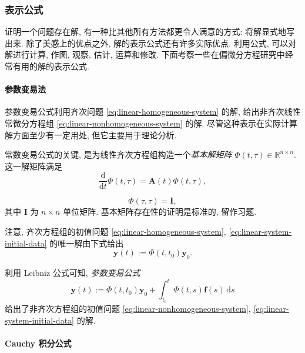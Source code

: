 \subsubsection{表示公式}\label{subsec:representations}

证明一个问题存在解, 有一种比其他所有方法都更令人满意的方式: 将解显式地写出来. 除了美感上的优点之外, 解的表示公式还有许多实际优点. 利用公式, 可以对解进行计算, 作图, 观察, 估计, 运算和修改. 下面考察一些在偏微分方程研究中经常有用的解的表示公式.

\paragraph*{参数变易法}

参数变易公式利用齐次问题 \eqref{eq:linear-homogeneous-system} 的解, 给出非齐次线性常微分方程组 \eqref{eq:linear-nonhomogeneous-system} 的解. 尽管这种表示在实际计算解方面至少有一定用处, 但它主要用于理论分析.

常数变易公式的关键, 是为线性齐次方程组构造一个\emph{基本解矩阵} $\Phi(t,\tau)\in\mathbb{R}^{n\times n}$. 这一解矩阵满足
\begin{equation}\label{eq:fundamental-matrix-dynamics}
\dfrac{\mathrm{d}}{\mathrm{d}t}\Phi(t,\tau)=\bm{A}(t)\Phi(t,\tau),
\end{equation}

\begin{equation}\label{eq:fundamental-matrix-normalization}
\Phi(\tau,\tau)=\bm{I},
\end{equation}
其中 $\bm{I}$ 为 $n\times n$ 单位矩阵. 基本矩阵存在性的证明是标准的, 留作习题.

注意, 齐次方程组的初值问题 \eqref{eq:linear-homogeneous-system}, \eqref{eq:linear-system-initial-data} 的唯一解由下式给出
\begin{equation}\label{eq:fundamental-matrix-homogeneous-solution}
\bm{y}(t):=\Phi(t,t_0)\bm{y}_0.
\end{equation}


利用 Leibniz 公式可知, \emph{参数变易公式}
\begin{equation}\label{eq:variation-of-parameters}
\bm{y}(t):=\Phi(t,t_0)\bm{y}_0+\int_{t_0}^t\Phi(t,s)\bm{f}(s)\,\mathrm{d}s
\end{equation}
给出了非齐次方程组的初值问题 \eqref{eq:linear-nonhomogeneous-system}, \eqref{eq:linear-system-initial-data} 的解.

\paragraph*{Cauchy 积分公式}

